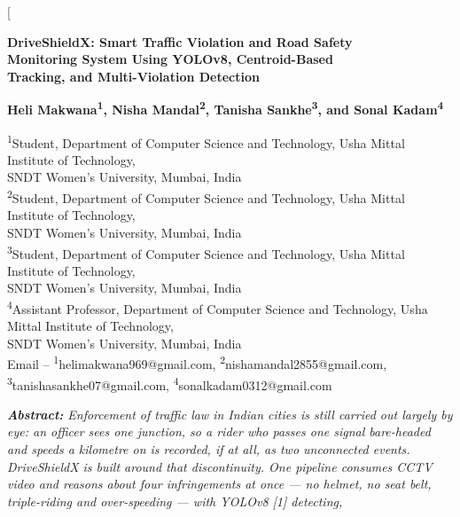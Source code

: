 \documentclass[10pt,a4paper,twocolumn]{article}
\begin{document}
\twocolumn[{%
\begin{center}
{\LARGE\bfseries DriveShieldX: Smart Traffic Violation and Road Safety\\[2pt]
Monitoring System Using YOLOv8, Centroid-Based\\[2pt]
Tracking, and Multi-Violation Detection\par}
\vspace{8pt}
{\large\bfseries Heli Makwana\textsuperscript{1}, Nisha Mandal\textsuperscript{2}, Tanisha Sankhe\textsuperscript{3}, and Sonal Kadam\textsuperscript{4}\par}
\vspace{5pt}
{\small
\textsuperscript{1}Student, Department of Computer Science and Technology, Usha Mittal Institute of Technology,\\ SNDT Women's University, Mumbai, India\\
\textsuperscript{2}Student, Department of Computer Science and Technology, Usha Mittal Institute of Technology,\\ SNDT Women's University, Mumbai, India\\
\textsuperscript{3}Student, Department of Computer Science and Technology, Usha Mittal Institute of Technology,\\ SNDT Women's University, Mumbai, India\\
\textsuperscript{4}Assistant Professor, Department of Computer Science and Technology, Usha Mittal Institute of Technology,\\ SNDT Women's University, Mumbai, India\\[3pt]
Email -- \textsuperscript{1}helimakwana969@gmail.com, \textsuperscript{2}nishamandal2855@gmail.com,\\
\textsuperscript{3}tanishasankhe07@gmail.com, \textsuperscript{4}sonalkadam0312@gmail.com\par}
\end{center}
\vspace{4pt}
\begin{list}{}{\leftmargin=6mm\rightmargin=6mm}\item\small\itshape
\textbf{Abstract:} Enforcement of traffic law in Indian cities is still carried out largely by eye: an officer sees one
junction, so a rider who passes one signal bare-headed and speeds a kilometre on is recorded, if at all, as two
unconnected events. DriveShieldX is built around that discontinuity. One pipeline consumes CCTV video and reasons about
four infringements at once --- no helmet, no seat belt, triple-riding and over-speeding --- with YOLOv8 [1] detecting,

\end{list}}
\end{document}

